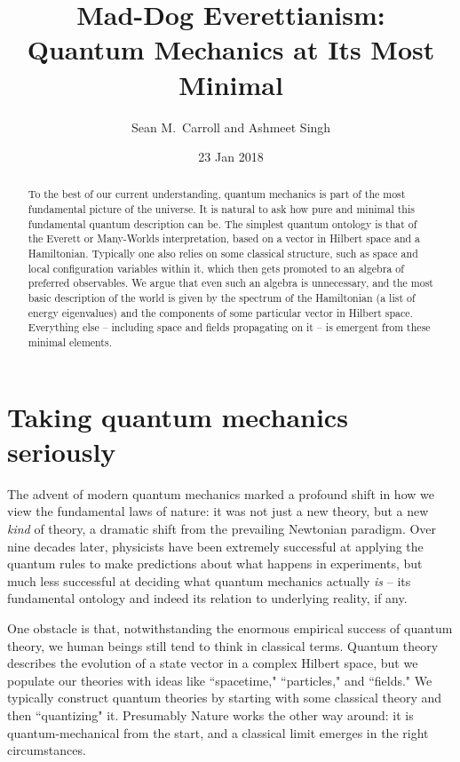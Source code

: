 \documentclass[12pt,english]{article}
\begin{document}
\setcounter{footnote}{0}

\vspace{2cm}
\title{Mad-Dog Everettianism:\\
Quantum Mechanics at Its Most Minimal}

\author{ Sean M.\ Carroll and Ashmeet Singh}
\date{23 Jan 2018}

\maketitle
\thispagestyle{empty}

\begin{abstract}
To the best of our current understanding, quantum mechanics is part of the most fundamental picture of the universe.
It is natural to ask how pure and minimal this fundamental quantum description can be.
The simplest quantum ontology is that of the Everett or Many-Worlds interpretation, based on a vector in Hilbert space and a Hamiltonian.
Typically one also relies on some classical structure, such as space and local configuration variables within it, which then gets promoted to an algebra of preferred observables.
We argue that even such an algebra is unnecessary, and the most basic description of the world is given by the spectrum of the Hamiltonian (a list of energy eigenvalues) and the components of some particular vector in Hilbert space.
Everything else -- including space and fields propagating on it -- is emergent from these minimal elements.
\end{abstract}

\newpage


\section{Taking quantum mechanics seriously}

The advent of modern quantum mechanics marked a profound shift in how we view the fundamental laws of nature: it was not just a new theory, but a new \emph{kind} of theory, a dramatic shift from the prevailing Newtonian paradigm.
Over nine decades later, physicists have been extremely successful at applying the quantum rules to make predictions about what happens in experiments, but much less successful at deciding what quantum mechanics actually \emph{is} -- its fundamental ontology and indeed its relation to underlying reality, if any.

One obstacle is that, notwithstanding the enormous empirical success of quantum theory, we human beings still tend to think in classical terms.
Quantum theory describes the evolution of a state vector in a complex Hilbert space, but we populate our theories with ideas like ``spacetime," ``particles," and ``fields."
We typically construct quantum theories by starting with some classical theory and then ``quantizing" it.
Presumably Nature works the other way around: it is quantum-mechanical from the start, and a classical limit emerges in the right circumstances.
\end{document}
